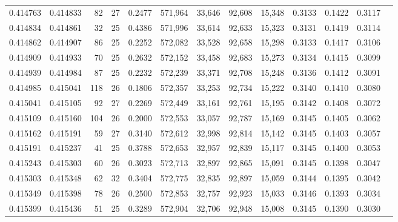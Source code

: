 \begin{tabular}{rrrrrrrrrrrrr}
0.414763 & 0.414833 &    82 &  27 &                                     0.2477 & 571,964 &  33,646 &  92,608 &  15,348 & 0.3133 & 0.1422 & 0.3117 \\
0.414834 & 0.414861 &    32 &  25 &                                     0.4386 & 571,996 &  33,614 &  92,633 &  15,323 & 0.3131 & 0.1419 & 0.3114 \\
0.414862 & 0.414907 &    86 &  25 &                                     0.2252 & 572,082 &  33,528 &  92,658 &  15,298 & 0.3133 & 0.1417 & 0.3106 \\
0.414909 & 0.414933 &    70 &  25 &                                     0.2632 & 572,152 &  33,458 &  92,683 &  15,273 & 0.3134 & 0.1415 & 0.3099 \\
0.414939 & 0.414984 &    87 &  25 &                                     0.2232 & 572,239 &  33,371 &  92,708 &  15,248 & 0.3136 & 0.1412 & 0.3091 \\
0.414985 & 0.415041 &   118 &  26 &                                     0.1806 & 572,357 &  33,253 &  92,734 &  15,222 & 0.3140 & 0.1410 & 0.3080 \\
0.415041 & 0.415105 &    92 &  27 &                                     0.2269 & 572,449 &  33,161 &  92,761 &  15,195 & 0.3142 & 0.1408 & 0.3072 \\
0.415109 & 0.415160 &   104 &  26 &                                     0.2000 & 572,553 &  33,057 &  92,787 &  15,169 & 0.3145 & 0.1405 & 0.3062 \\
0.415162 & 0.415191 &    59 &  27 &                                     0.3140 & 572,612 &  32,998 &  92,814 &  15,142 & 0.3145 & 0.1403 & 0.3057 \\
0.415191 & 0.415237 &    41 &  25 &                                     0.3788 & 572,653 &  32,957 &  92,839 &  15,117 & 0.3145 & 0.1400 & 0.3053 \\
0.415243 & 0.415303 &    60 &  26 &                                     0.3023 & 572,713 &  32,897 &  92,865 &  15,091 & 0.3145 & 0.1398 & 0.3047 \\
0.415303 & 0.415348 &    62 &  32 &                                     0.3404 & 572,775 &  32,835 &  92,897 &  15,059 & 0.3144 & 0.1395 & 0.3042 \\
0.415349 & 0.415398 &    78 &  26 &                                     0.2500 & 572,853 &  32,757 &  92,923 &  15,033 & 0.3146 & 0.1393 & 0.3034 \\
0.415399 & 0.415436 &    51 &  25 &                                     0.3289 & 572,904 &  32,706 &  92,948 &  15,008 & 0.3145 & 0.1390 & 0.3030 \\

\end{tabular}
